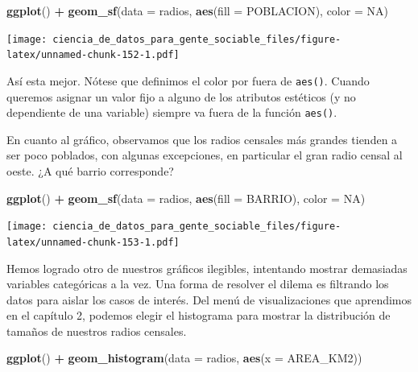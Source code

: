 \documentclass[spanish,]{book}
\newenvironment{Shaded}{\begin{snugshade}}{\end{snugshade}}
\newcommand{\DataTypeTok}[1]{\textcolor[rgb]{0.13,0.29,0.53}{#1}}
\newcommand{\KeywordTok}[1]{\textcolor[rgb]{0.13,0.29,0.53}{\textbf{#1}}}
\newcommand{\NormalTok}[1]{#1}
\newcommand{\OperatorTok}[1]{\textcolor[rgb]{0.81,0.36,0.00}{\textbf{#1}}}
\newcommand{\OtherTok}[1]{\textcolor[rgb]{0.56,0.35,0.01}{#1}}
\newcommand{\StringTok}[1]{\textcolor[rgb]{0.31,0.60,0.02}{#1}}
\begin{document}
\begin{Shaded}
\begin{Highlighting}[]
\KeywordTok{ggplot}\NormalTok{() }\OperatorTok{+}\StringTok{ }\KeywordTok{geom_sf}\NormalTok{(}\DataTypeTok{data =}\NormalTok{ radios, }\KeywordTok{aes}\NormalTok{(}\DataTypeTok{fill =}\NormalTok{ POBLACION), }\DataTypeTok{color =} \OtherTok{NA}\NormalTok{)}
\end{Highlighting}
\end{Shaded}

\texttt{[image: ciencia\_de\_datos\_para\_gente\_sociable\_files/figure-latex/unnamed-chunk-152-1.pdf]}

Así esta mejor. Nótese que definimos el color por fuera de \texttt{aes()}. Cuando queremos asignar un valor fijo a alguno de los atributos estéticos (y no dependiente de una variable) siempre va fuera de la función \texttt{aes()}.

En cuanto al gráfico, observamos que los radios censales más grandes tienden a ser poco poblados, con algunas excepciones, en particular el gran radio censal al oeste. ¿A qué barrio corresponde?

\begin{Shaded}
\begin{Highlighting}[]
\KeywordTok{ggplot}\NormalTok{() }\OperatorTok{+}\StringTok{ }\KeywordTok{geom_sf}\NormalTok{(}\DataTypeTok{data =}\NormalTok{ radios, }\KeywordTok{aes}\NormalTok{(}\DataTypeTok{fill =}\NormalTok{ BARRIO), }\DataTypeTok{color =} \OtherTok{NA}\NormalTok{)}
\end{Highlighting}
\end{Shaded}

\texttt{[image: ciencia\_de\_datos\_para\_gente\_sociable\_files/figure-latex/unnamed-chunk-153-1.pdf]}

Hemos logrado otro de nuestros gráficos ilegibles, intentando mostrar demasiadas variables categóricas a la vez. Una forma de resolver el dilema es filtrando los datos para aislar los casos de interés. Del menú de visualizaciones que aprendimos en el capítulo 2, podemos elegir el histograma para mostrar la distribución de tamaños de nuestros radios censales.

\begin{Shaded}
\begin{Highlighting}[]
\KeywordTok{ggplot}\NormalTok{() }\OperatorTok{+}\StringTok{ }\KeywordTok{geom_histogram}\NormalTok{(}\DataTypeTok{data =}\NormalTok{ radios, }\KeywordTok{aes}\NormalTok{(}\DataTypeTok{x =}\NormalTok{ AREA_KM2))}
\end{Highlighting}
\end{Shaded}
\end{document}
